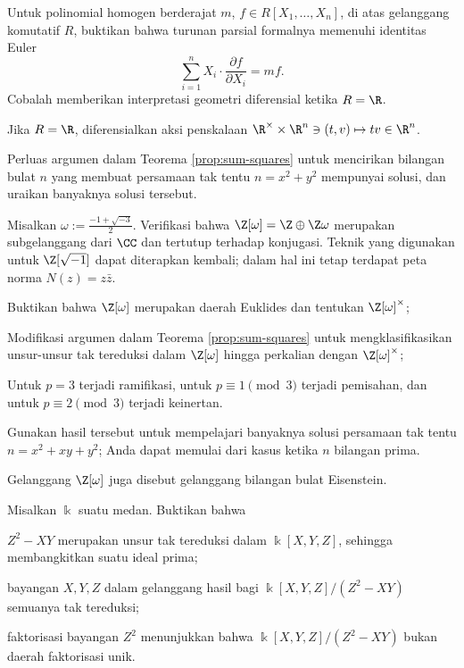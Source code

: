 \begin{Exercises}
	\item Untuk polinomial homogen berderajat $m$, $f \in R[X_1, \ldots, X_n]$, di atas gelanggang komutatif $R$, buktikan bahwa turunan parsial formalnya memenuhi identitas Euler
		\[ \sum_{i=1}^n X_i \cdot \frac{\partial f}{\partial X_i} = m f. \]
		Cobalah memberikan interpretasi geometri diferensial ketika $R=\R$. \begin{hint} Jika $R=\R$, diferensialkan aksi penskalaan $\R^\times \times \R^n \ni (t,v) \mapsto tv \in \R^n$. \end{hint}
	\item Perluas argumen dalam Teorema \ref{prop:sum-squares} untuk mencirikan bilangan bulat $n$ yang membuat persamaan tak tentu $n = x^2 + y^2$ mempunyai solusi, dan uraikan banyaknya solusi tersebut.
	\item Misalkan $\omega := \frac{-1 + \sqrt{-3}}{2}$. Verifikasi bahwa $\Z[\omega] = \Z \oplus \Z\omega$ merupakan subgelanggang dari $\CC$ dan tertutup terhadap konjugasi. Teknik yang digunakan untuk $\Z[\sqrt{-1}]$ dapat diterapkan kembali; dalam hal ini tetap terdapat peta norma $N(z) = z\bar{z}$.
		\begin{compactenum}[(i)]
			\item Buktikan bahwa $\Z[\omega]$ merupakan daerah Euklides dan tentukan $\Z[\omega]^\times$;
			\item Modifikasi argumen dalam Teorema \ref{prop:sum-squares} untuk mengklasifikasikan unsur-unsur tak tereduksi dalam $\Z[\omega]$ hingga perkalian dengan $\Z[\omega]^\times$; \begin{hint} Untuk $p=3$ terjadi ramifikasi, untuk $p \equiv 1 \pmod 3$ terjadi pemisahan, dan untuk $p \equiv 2 \pmod 3$ terjadi keinertan. \end{hint}
			\item Gunakan hasil tersebut untuk mempelajari banyaknya solusi persamaan tak tentu $n = x^2 + xy + y^2$; Anda dapat memulai dari kasus ketika $n$ bilangan prima.
		\end{compactenum}
		Gelanggang $\Z[\omega]$ juga disebut gelanggang bilangan bulat Eisenstein.
	\item Misalkan $\Bbbk$ suatu medan. Buktikan bahwa
		\begin{inparaenum}[(i)]
			\item $Z^2-XY$ merupakan unsur tak tereduksi dalam $\Bbbk[X,Y,Z]$, sehingga membangkitkan suatu ideal prima;
			\item bayangan $X, Y, Z$ dalam gelanggang hasil bagi $\Bbbk[X,Y,Z]/(Z^2-XY)$ semuanya tak tereduksi;
			\item faktorisasi bayangan $Z^2$ menunjukkan bahwa $\Bbbk[X,Y,Z]/(Z^2-XY)$ bukan daerah faktorisasi unik.

\end{inparaenum}
\end{Exercises}
